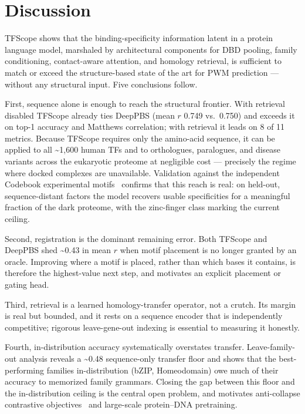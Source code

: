 \documentclass[11pt,letterpaper]{article}
\newcommand{\ts}{\textasciitilde}
\begin{document}
\section*{Discussion}

TFScope shows that the binding-specificity information latent in a protein language
model, marshaled by architectural components for DBD pooling, family conditioning,
contact-aware attention, and homology retrieval, is sufficient to match or exceed
the structure-based state of the art for PWM prediction — without any structural
input. Five conclusions follow.

First, sequence alone is enough to reach the structural frontier. With retrieval
disabled TFScope already ties DeepPBS (mean $r$ 0.749 vs.\ 0.750) and exceeds it on
top-1 accuracy and Matthews correlation; with retrieval it leads on 8 of 11 metrics.
Because TFScope requires only the amino-acid sequence, it can be applied to all
\ts1,600 human TFs and to orthologues, paralogues, and disease variants across the
eukaryotic proteome at negligible cost — precisely the regime where docked complexes
are unavailable. Validation against the independent Codebook experimental
motifs~\cite{Codebook2024} confirms that this reach is real: on held-out,
sequence-distant factors the model recovers usable specificities for a meaningful
fraction of the dark proteome, with the zinc-finger class marking the current
ceiling.

Second, registration is the dominant remaining error. Both TFScope and DeepPBS shed
\ts0.43 in mean $r$ when motif placement is no longer granted by an oracle. Improving
where a motif is placed, rather than which bases it contains, is therefore the
highest-value next step, and motivates an explicit placement or gating head.

Third, retrieval is a learned homology-transfer operator, not a crutch. Its margin is
real but bounded, and it rests on a sequence encoder that is independently
competitive; rigorous leave-gene-out indexing is essential to measuring it honestly.

Fourth, in-distribution accuracy systematically overstates transfer. Leave-family-out
analysis reveals a \ts0.48 sequence-only transfer floor and shows that the
best-performing families in-distribution (bZIP, Homeodomain) owe much of their
accuracy to memorized family grammars. Closing the gap between this floor and the
in-distribution ceiling is the central open problem, and motivates anti-collapse
contrastive objectives~\cite{Bhatt2024} and large-scale protein--DNA pretraining.
\end{document}
